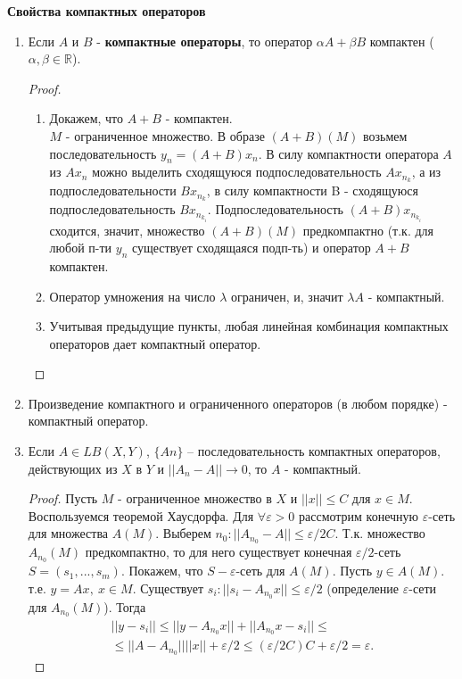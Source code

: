 \bigbreak
\textbf{Свойства компактных операторов}
\begin{enumerate}
    \item Если $A$ и $B$ - \textbf{компактные операторы}, то оператор $\alpha A+ \beta B$ компактен ($\alpha, \beta \in \mathbb{R}$).
    \begin{proof}
        \begin{enumerate}
            
            \item Докажем, что $A+B$ - компактен. \\ 
            \mathLet $M$ - ограниченное множество. В образе $(A+B)(M)$ возьмем последовательность $y_n = (A+B)x_n$. В силу компактности оператора $A$ из $Ax_n$ можно выделить сходящуюся подпоследовательность $Ax_{n_k}$, а из подпоследовательности $Bx_{n_k}$, в силу компактности B - сходящуюся подпоследовательность $Bx_{n_{k_i}}$. Подпоследовательность $(A+B)x_{n_{k_i}}$ сходится, значит, множество $(A+B)(M)$ предкомпактно (т.к. для любой п-ти $y_n$ существует сходящаяся подп-ть) и оператор $A+B$ компактен.

            \item Оператор умножения на число $\lambda$ ограничен, и, значит $\lambda A$ - компактный.

            \item Учитывая предыдущие пункты, любая линейная комбинация компактных операторов дает компактный оператор.
        \end{enumerate}
        
    \end{proof}

    \item Произведение компактного и ограниченного операторов (в любом порядке) - компактный оператор.


    \item Если $A \in LB(X,Y)$, $\{An\}$ – последовательность компактных операторов, действующих из $X$ в $Y$ и $||A_n - A|| \rightarrow 0$, то $A$ - компактный.
    \begin{proof}
        Пусть $M$ - ограниченное множество в $X$ и $||x|| \le C \text{ для } x \in M$.
        Воспользуемся теоремой Хаусдорфа. Для $\forall \varepsilon > 0$ рассмотрим конечную $\varepsilon$-сеть для множества $A(M)$. Выберем $n_0: ||A_{n_0} - A|| \le \varepsilon/2C$. Т.к. множество $A_{n_0}(M)$ предкомпактно, то для него существует конечная $\varepsilon/2$-сеть $S = (s_1, ..., s_m).$ Покажем, что $S - \varepsilon$-сеть для $A(M)$. Пусть $y \in A(M)$. т.е. $y = Ax, \ x \in M$. Существует $s_i: ||s_i - A_{n_0}x|| \le \varepsilon/2$ (определение $\varepsilon$-сети для $A_{n_0}(M)$). Тогда
        \begin{align*}
            ||y-s_i|| \le ||y - A_{n_0}x|| + ||A_{n_0}x - s_i|| \le \\
            \le ||A - A_{n_0}|| ||x|| + \varepsilon/2 \le (\varepsilon/2C)C + \varepsilon/2 = \varepsilon .
        \end{align*}
    \end{proof}
\end{enumerate}